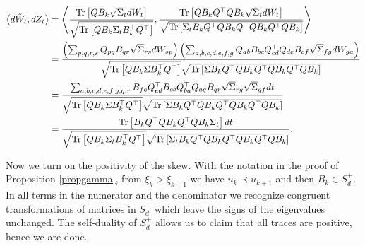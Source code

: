 \begin{align}
\left\langle d\tilde{W}_t,dZ_t\right\rangle&=\left\langle \frac{\textup{Tr}\left[QB_k\sqrt{\Sigma_t}dW_t\right]}{\sqrt{\textup{Tr}\left[QB_k\Sigma_t B_k^{\top}Q^{\top}\right]}},\frac{\textup{Tr}\left[QB_kQ^{\top}QB_k\sqrt{\Sigma_t}dW_t\right]}{\sqrt{\textup{Tr}\left[\Sigma_t B_kQ^{\top}QB_kQ^{\top}QB_kQ^{\top}QB_k \right]}} \right\rangle\nonumber\\
&=\frac{\left(\sum_{p,q,r,s}{Q_{pq}B_{qr}\sqrt{\Sigma}_{rs}dW_{sp}}\right)\left(\sum_{a,b,c,d,e,f,g}{Q_{ab}B_{bc}Q^{\top}_{cd}Q_{de}B_{ef}\sqrt{\Sigma}_{fg}dW_{ga}}\right)}{\sqrt{\textup{Tr}\left[QB_k\Sigma B_k^{\top}Q^{\top}\right]}\sqrt{\textup{Tr}\left[\Sigma B_kQ^{\top}QB_kQ^{\top}QB_kQ^{\top}QB_k \right]}}\nonumber\\
&=\frac{\sum_{a,b,c,d,e,f,g,q,r}{B_{fe}Q^{\top}_{ed}B_{cb}Q^{\top}_{ba}Q_{aq}B_{qr}\sqrt{\Sigma}_{rg}\sqrt{\Sigma}_{gf}}dt}{\sqrt{\textup{Tr}\left[QB_k\Sigma B_k^{\top}Q^{\top}\right]}\sqrt{\textup{Tr}\left[\Sigma B_kQ^{\top}QB_kQ^{\top}QB_kQ^{\top}QB_k \right]}}\nonumber\\
&=\frac{\textup{Tr}\left[B_kQ^{\top}QB_kQ^{\top}QB_k\Sigma_t\right]dt}{\sqrt{\textup{Tr}\left[QB_k\Sigma_t B_k^{\top}Q^{\top}\right]}\sqrt{\textup{Tr}\left[\Sigma_t B_kQ^{\top}QB_kQ^{\top}QB_kQ^{\top}QB_k \right]}}.\nonumber
\end{align}

Now we turn on the positivity of the skew. With the notation in the proof of Proposition \ref{propgamma}, from $\xi_k>\xi_{k+1}$ we have $u_k\prec u_{k+1}$ and then $B_k\in S_d^+$. In all terms in the numerator and the denominator we recognize congruent transformations of matrices in $S_d^+$ which leave the signs of the eigenvalues unchanged. The self-duality of $S_d^+$ allows us to claim that all traces are positive, hence we are done.
\endproof










